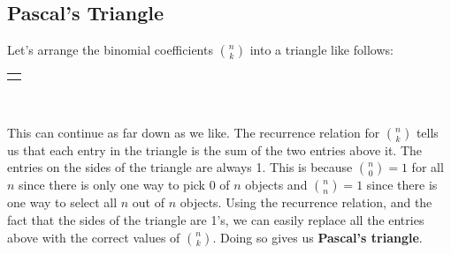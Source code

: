 \documentclass[12pt,]{book}
\newcommand{\terminology}[1]{\textbf{#1}}
\theoremstyle{plain}
\theoremstyle{definition}
\theoremstyle{definition}
\theoremstyle{definition}
\numberwithin{equation}{chapter}
\newlength{\panelmax}
\begin{document}
\subsection[{Pascal's Triangle}]{Pascal's Triangle}\label{subsec_Pascal}
\hypertarget{p-862}{}%
Let's arrange the binomial coefficients \({n \choose k}\) into a triangle like follows:%
{%
\setlength{\panelmax}{0pt}
\ifdefined\panelboxAimage\else\newsavebox{\panelboxAimage}\fi%
\begin{lrbox}{\panelboxAimage}
\end{lrbox}
\ifdefined\phAimage\else\newlength{\phAimage}\fi%
\setlength{\phAimage}{\ht\panelboxAimage+\dp\panelboxAimage}
\settototalheight{\phAimage}{\usebox{\panelboxAimage}}
\setlength{\panelmax}{\maxof{\panelmax}{\phAimage}}
\leavevmode%
\setlength{\tabcolsep}{0\linewidth}
\par\medskip\noindent
\hspace*{0.15\linewidth}%
\begin{tabular}{@{}*{1}{c}@{}}
\begin{minipage}[c][\panelmax][t]{0.7\linewidth}\usebox{\panelboxAimage}\end{minipage}\end{tabular}\\
}%
\par
\hypertarget{p-863}{}%
This can continue as far down as we like. The recurrence relation for \({n \choose k}\) tells us that each entry in the triangle is the sum of the two entries above it. The entries on the sides of the triangle are always 1. This is because \({n \choose 0} = 1\) for all \(n\) since there is only one way to pick 0 of \(n\) objects and \({n \choose n} = 1\) since there is one way to select all \(n\) out of \(n\) objects. Using the recurrence relation, and the fact that the sides of the triangle are 1's, we can easily replace all the entries above with the correct values of \({n \choose k}\). Doing so gives us \terminology{Pascal's triangle}.%
\end{document}
